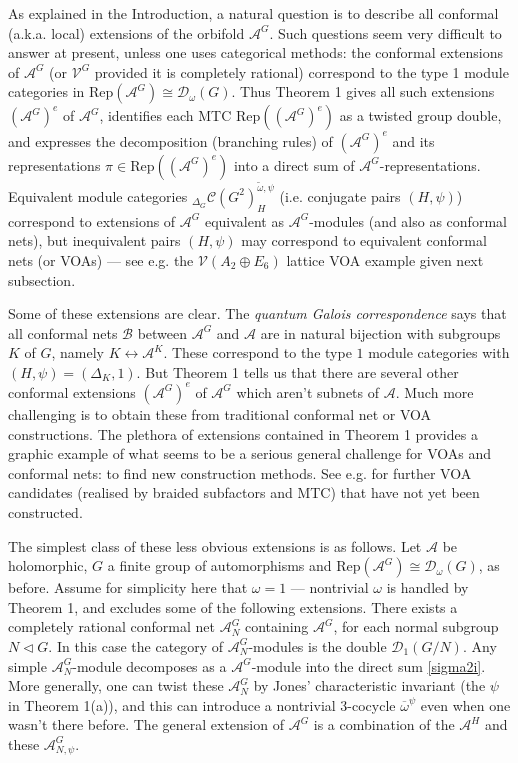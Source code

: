 \documentclass[12pt]{article}
\numberwithin{equation}{section}
\def\cA            {{\mathcal{A}}}
\def\cB            {{\mathcal{B}}}
\def\cC            {{\mathcal{C}}}
\def\cD            {{\mathcal{D}}}
\def\cV            {{\mathcal{V}}}
\begin{document}
 
As explained in the Introduction, a natural question is to describe all conformal (a.k.a.{} local) extensions of the orbifold
$\cA^G$. Such questions  seem very difficult to answer at present, unless one uses categorical methods:
 the conformal extensions of $\cA^G$ (or $\cV^G$ provided it is completely rational) correspond to the type 1 module categories \cite{Kir,HKL,CKM} in Rep$(\cA^G)\cong\cD_\omega(G)$. Thus Theorem 1 gives all such extensions $(\cA^G)^e$ of $\cA^G$, identifies each MTC Rep$((\cA^G)^e)$ as a twisted group double, 
and expresses the decomposition (branching rules) of $(\cA^G)^e$ and its
representations $\pi\in\mathrm{Rep}((\cA^G)^e)$ into a direct sum of $\cA^G$-representations. Equivalent module categories ${}_{\Delta_G}\cC(G^2)_H^{\tilde{\omega},\psi}$ (i.e. conjugate pairs $(H,\psi)$) correspond to extensions of $\cA^G$ equivalent as $\cA^G$-modules (and also as conformal nets),
 but inequivalent pairs $(H,\psi)$ may correspond to equivalent conformal nets (or VOAs) --- see e.g. the $\cV(A_2\oplus E_6)$ lattice VOA example given next subsection. 

Some of these extensions are clear. The \textit{quantum Galois correspondence}  \cite{HMT,DoMa} says that
all conformal nets $\cB$ between $\cA^G$ and $\cA$ are in natural bijection with subgroups $K$
of $G$,  namely $K\leftrightarrow \cA^K$. These correspond to the 
type $1$ module categories with $(H,\psi)=(\Delta_K,1)$. But Theorem 1 tells us that there are several other conformal extensions $(\cA^G)^e$ of $\cA^G$ which aren't subnets of $\cA$. Much more challenging is
to obtain these from traditional conformal net or VOA constructions. The plethora of extensions contained in Theorem 1 provides a graphic
example of what seems to be a serious {general} challenge for VOAs and conformal nets: to find new construction methods.
See e.g. \cite{EG2} for further VOA candidates  (realised by braided subfactors and MTC) that have not yet been constructed. 


The simplest class of these less obvious extensions is as follows. Let $\cA$ be holomorphic, $G$  a finite group of automorphisms and Rep$(\cA^G)\cong\cD_\omega(G)$,  as before.
Assume for simplicity here that $\omega=1$ --- nontrivial $\omega$ is handled by Theorem 1, and excludes some of the following extensions. There exists
a completely rational conformal net $\cA^G_N$ containing $\cA^G$, for each normal subgroup $N\triangleleft G$.
In this case the category of $\cA^G_N$-modules is the double $\cD_{1}({G}/N)$. Any simple $\cA^G_N$-module
decomposes as a $\cA^G$-module into the direct sum \eqref{sigma2i}. More generally, one can twist  these  
$\cA^G_N$ by Jones' characteristic invariant (the $\psi$ in Theorem 1(a)), and this can introduce a nontrivial 3-cocycle $\overline{\omega}^\psi$ even when one wasn't there before. The general extension of $\cA^G$ is a combination of the $\cA^H$ and these $\cA^G_{N,\psi}$.
  
\end{document}
